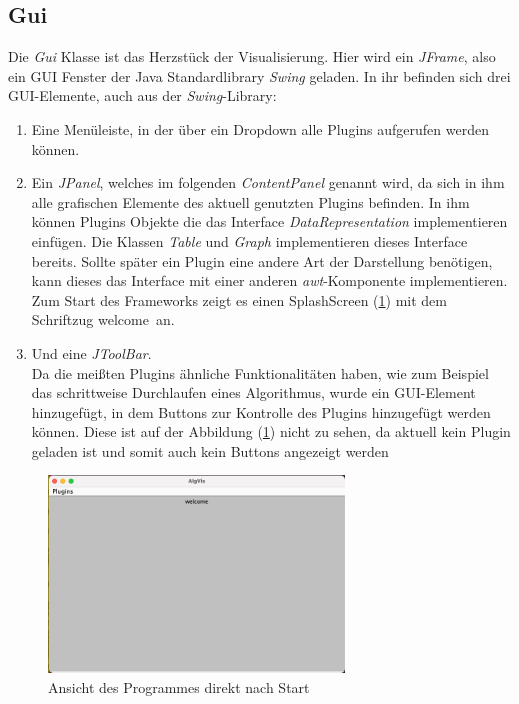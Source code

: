 \subsection{Gui} 
Die \textit{Gui} Klasse ist das Herzstück der Visualisierung. Hier wird ein \textit{JFrame},
also ein GUI Fenster der Java Standardlibrary \textit{Swing} geladen. In ihr befinden sich
drei GUI-Elemente, auch aus der \textit{Swing}-Library:
\begin{enumerate}
  \item Eine Menüleiste, in der über ein Dropdown alle Plugins aufgerufen werden können.
  \item Ein \textit{JPanel}, welches im folgenden \textit{ContentPanel} genannt wird, 
    da sich in ihm alle grafischen Elemente des aktuell genutzten Plugins befinden.
    In ihm können Plugins Objekte die das Interface
    \textit{DataRepresentation} implementieren einfügen.
    Die Klassen \textit{Table} und \textit{Graph} implementieren dieses Interface bereits. 
    Sollte später ein Plugin eine andere Art der Darstellung benötigen,
    kann dieses das Interface mit einer anderen \textit{awt}-Komponente implementieren.
    Zum Start des Frameworks zeigt es einen SplashScreen (\cref{fig:screenshot_splashScreen}) mit dem Schriftzug \glqq welcome\grqq\ an.
  \item Und eine \textit{JToolBar}.\\
    Da die meißten Plugins ähnliche Funktionalitäten haben, wie zum Beispiel
    das schrittweise Durchlaufen eines Algorithmus, 
    wurde ein GUI-Element hinzugefügt, in dem Buttons zur Kontrolle des Plugins
    hinzugefügt werden können. Diese ist auf der Abbildung (\cref{fig:screenshot_splashScreen})
    nicht zu sehen, da aktuell kein Plugin geladen ist und somit auch kein Buttons angezeigt werden
\end{enumerate}


\newpage
\begin{figure}[h!]
  \centering
  \includegraphics[width=0.7\textwidth]{fig/Screenshot_SplashScreen.png}
  \caption{Ansicht des Programmes direkt nach Start}
  \label{fig:screenshot_splashScreen}
\end{figure}



